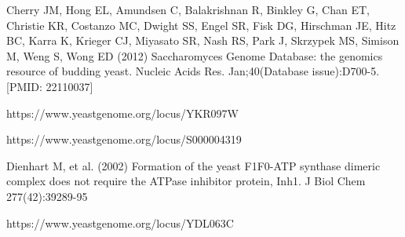 \documentclass{article}
\begin{document}
\begin{thebibliography}{9}
Cherry JM, Hong EL, Amundsen C, Balakrishnan R, Binkley G, Chan ET, Christie KR, Costanzo MC, Dwight SS, Engel SR, Fisk DG, Hirschman JE, Hitz BC, Karra K, Krieger CJ, Miyasato SR, Nash RS, Park J, Skrzypek MS, Simison M, Weng S, Wong ED (2012) Saccharomyces Genome Database: the genomics resource of budding yeast. Nucleic Acids Res. Jan;40(Database issue):D700-5. [PMID: 22110037]

 
 https://www.yeastgenome.org/locus/YKR097W
 
https://www.yeastgenome.org/locus/S000004319

 Dienhart M, et al. (2002) Formation of the yeast F1F0-ATP synthase dimeric complex does not require the ATPase inhibitor protein, Inh1. J Biol Chem 277(42):39289-95

https://www.yeastgenome.org/locus/YDL063C

\end{thebibliography}

  
\end{document}

